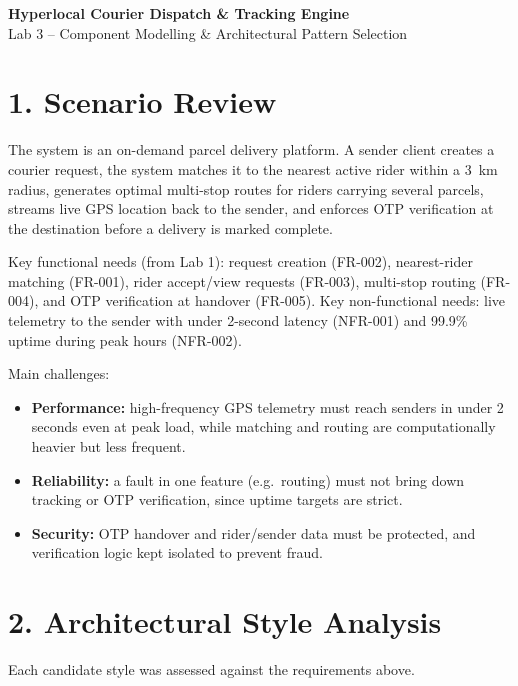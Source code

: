 \documentclass[11pt]{article}
\begin{document}
\begin{center}
{\LARGE \textbf{Hyperlocal Courier Dispatch \& Tracking Engine}}\\[4pt]
{\large Lab 3 -- Component Modelling \& Architectural Pattern Selection}\\[2pt]
\end{center}

\vspace{4pt}

\section*{1. Scenario Review}

The system is an on-demand parcel delivery platform. A sender client creates a courier request, the system matches it to the nearest active rider within a 3~km radius, generates optimal multi-stop routes for riders carrying several parcels, streams live GPS location back to the sender, and enforces OTP verification at the destination before a delivery is marked complete.

Key functional needs (from Lab 1): request creation (FR-002), nearest-rider matching (FR-001), rider accept/view requests (FR-003), multi-stop routing (FR-004), and OTP verification at handover (FR-005). Key non-functional needs: live telemetry to the sender with under 2-second latency (NFR-001) and 99.9\% uptime during peak hours (NFR-002).

Main challenges:
\begin{itemize}[leftmargin=1.4em,nosep]
\item \textbf{Performance:} high-frequency GPS telemetry must reach senders in under 2 seconds even at peak load, while matching and routing are computationally heavier but less frequent.
\item \textbf{Reliability:} a fault in one feature (e.g.\ routing) must not bring down tracking or OTP verification, since uptime targets are strict.
\item \textbf{Security:} OTP handover and rider/sender data must be protected, and verification logic kept isolated to prevent fraud.
\end{itemize}

\section*{2. Architectural Style Analysis}

Each candidate style was assessed against the requirements above.
\end{document}
